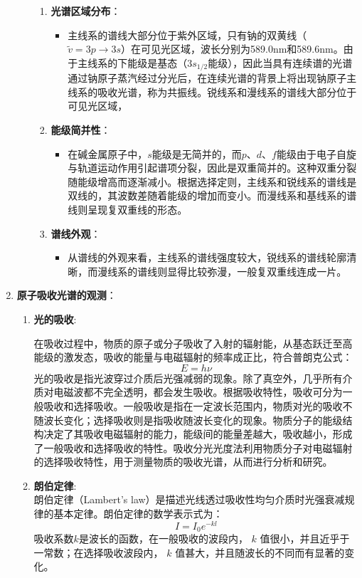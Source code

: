 \documentclass[dvipsnames, svgnames,a4paper,11pt]{article}
\begin{document}
\begin{enumerate}
\begin{enumerate}
						\begin{enumerate}
							\item \textbf{光谱区域分布}：
							\begin{itemize}
								\item 主线系的谱线大部分位于紫外区域，只有钠的双黄线（$\widetilde{v}=3p\rightarrow 3s$）在可见光区域，波长分别为589.0nm和589.6nm。由于主线系的下能级是基态（$3s_{1/2}$能级），因此当具有连续谱的光谱通过钠原子蒸汽经过分光后，在连续光谱的背景上将出现钠原子主线系的吸收光谱，称为共振线。锐线系和漫线系的谱线大部分位于可见光区域，
							\end{itemize}
							\item \textbf{能级简并性}：
							\begin{itemize}
								\item 在碱金属原子中，$s$能级是无简并的，而$p$、$d$、$f$能级由于电子自旋与轨道运动作用引起谱项分裂，因此是双重简并的。这种双重分裂随能级增高而逐渐减小。根据选择定则，主线系和锐线系的谱线是双线的，其波数差随着能级的增加而变小。而漫线系和基线系的谱线则呈现复双重线的形态。
							\end{itemize}
							\item \textbf{谱线外观}：
							\begin{itemize}
								\item 从谱线的外观来看，主线系的谱线强度较大，锐线系的谱线轮廓清晰，而漫线系的谱线则显得比较弥漫，一般复双重线连成一片。
							\end{itemize}
						\end{enumerate}
						
				
				\end{enumerate}
				
				
				
			\item \textbf{原子吸收光谱的观测}：
				\begin{enumerate}
					\item \textbf{光的吸收}:
						
						在吸收过程中，物质的原子或分子吸收了入射的辐射能，从基态跃迁至高能级的激发态，吸收的能量与电磁辐射的频率成正比，符合普朗克公式：
						\[ E = h\nu \]
						光的吸收是指光波穿过介质后光强减弱的现象。除了真空外，几乎所有介质对电磁波都不完全透明，都会发生吸收。根据吸收特性，吸收可分为一般吸收和选择吸收。一般吸收是指在一定波长范围内，物质对光的吸收不随波长变化；选择吸收则是指吸收随波长变化的现象。物质分子的能级结构决定了其吸收电磁辐射的能力，能级间的能量差越大，吸收越小，形成了一般吸收和选择吸收的特性。吸收分光光度法利用物质分子对电磁辐射的选择吸收特性，用于测量物质的吸收光谱，从而进行分析和研究。
					\item \textbf{朗伯定律}:\\
						朗伯定律（Lambert's law）是描述光线透过吸收性均匀介质时光强衰减规律的基本定律。朗伯定律的数学表示式为：
						\[ I = I_0 e^{-kl} \]
						吸收系数$k$是波长的函数，在一般吸收的波段内， $k$ 值很小，并且近乎于一常数；在选择吸收波段内， $k$ 值甚大，并且随波长的不同而有显著的变化。
						

\end{enumerate}
\end{enumerate}
\end{document}
